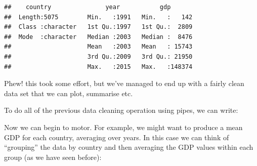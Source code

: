 \documentclass[]{book}
\newenvironment{Shaded}{\begin{snugshade}}{\end{snugshade}}
\newcommand{\KeywordTok}[1]{\textcolor[rgb]{0.13,0.29,0.53}{\textbf{{#1}}}}
\newcommand{\DataTypeTok}[1]{\textcolor[rgb]{0.13,0.29,0.53}{{#1}}}
\newcommand{\DecValTok}[1]{\textcolor[rgb]{0.00,0.00,0.81}{{#1}}}
\newcommand{\StringTok}[1]{\textcolor[rgb]{0.31,0.60,0.02}{{#1}}}
\newcommand{\NormalTok}[1]{{#1}}
\theoremstyle{definition}
\theoremstyle{definition}
\theoremstyle{definition}
\theoremstyle{remark}
\begin{document}
\begin{verbatim}
##    country               year           gdp        
##  Length:5075        Min.   :1991   Min.   :   142  
##  Class :character   1st Qu.:1997   1st Qu.:  2809  
##  Mode  :character   Median :2003   Median :  8476  
##                     Mean   :2003   Mean   : 15743  
##                     3rd Qu.:2009   3rd Qu.: 21950  
##                     Max.   :2015   Max.   :148374
\end{verbatim}

Phew! this took some effort, but we've managed to end up with a fairly
clean data set that we can plot, summarise etc.

To do all of the previous data cleaning operation using pipes, we can
write:

\begin{Shaded}
\end{Shaded}

Now we can begin to motor. For example, we might want to produce a mean
GDP for each country, averaging over years. In this case we can think of
``grouping'' the data by country and then averaging the GDP values
within each group (as we have seen before):

\begin{Shaded}
\end{Shaded}
\end{document}
